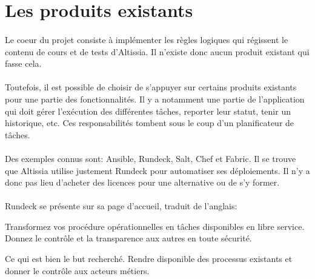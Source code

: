 \section{Les produits existants}
\label{sec:existing-products}

\paragraph{}
Le coeur du projet consiste à implémenter les règles logiques qui régissent le contenu de cours et de tests d'Altissia.
Il n'existe donc aucun produit existant qui fasse cela.

\paragraph{}
Toutefois, il est possible de choisir de s'appuyer sur certains produits existants pour une partie des fonctionnalités.
Il y a notamment une partie de l'application qui doit gérer l'exécution des différentes tâches, reporter leur statut, tenir un historique, etc.
Ces responsabilités tombent sous le coup d'un planificateur de tâches.

\paragraph{}
Des exemples connus sont: Ansible, Rundeck, Salt, Chef et Fabric.
Il se trouve que Altissia utilise justement Rundeck pour automatiser ses déploiements\fnmark. Il n'y a donc pas lieu d'acheter des licences pour une alternative ou de s'y former.


\paragraph{}
Rundeck se présente sur sa page d'accueil\cite{rundeck_rundeck_nodate}, traduit de l'anglais:
\begin{displayquote}
Transformez vos procédure opérationnelles en tâches disponibles en libre service. Donnez le contrôle et la transparence aux autres en toute sécurité.
\end{displayquote}
Ce qui est bien le but recherché.
Rendre disponible des processus existants et donner le contrôle aux acteurs métiers. 
